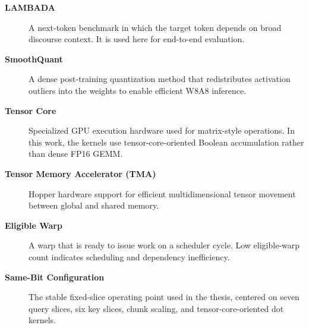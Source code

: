 \begin{description}
    \item[\textbf{LAMBADA}]
    A next-token benchmark in which the target token depends on broad discourse context. It is used here for end-to-end evaluation.

    \item[\textbf{SmoothQuant}]
    A dense post-training quantization method that redistributes activation outliers into the weights to enable efficient W8A8 inference.

    \item[\textbf{Tensor Core}]
    Specialized GPU execution hardware used for matrix-style operations. In this work, the kernels use tensor-core-oriented Boolean accumulation rather than dense FP16 GEMM.

    \item[\textbf{Tensor Memory Accelerator (TMA)}]
    Hopper hardware support for efficient multidimensional tensor movement between global and shared memory.

    \item[\textbf{Eligible Warp}]
    A warp that is ready to issue work on a scheduler cycle. Low eligible-warp count indicates scheduling and dependency inefficiency.

    \item[\textbf{Same-Bit Configuration}]
    The stable fixed-slice operating point used in the thesis, centered on seven query slices, six key slices, chunk scaling, and tensor-core-oriented dot kernels.
\end{description}
